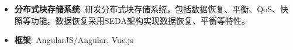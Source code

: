   \begin{itemize}[leftmargin=*]
    \item \textbf{分布式块存储系统}: 研发分布式块存储系统，包括数据恢复、平衡、QoS、快照等功能。数据恢复采用SEDA架构实现数据恢复、平衡等特性。
    \item \textbf{框架}: AngularJS/Angular, Vue.js
  \end{itemize}
